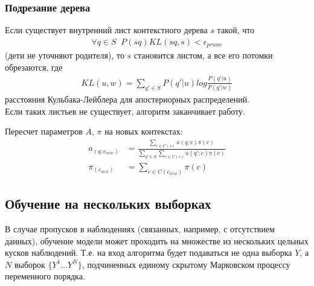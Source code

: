 \documentclass{matmex-diploma-custom}
\begin{document}
\subsubsection{Подрезание дерева} 
Если существует внутренний лист контекстного дерева $ s $ такой, что 
\begin{align}
\forall q \in S \;\; P(sq)\textit{KL}(sq, s) < \epsilon_{\textit{prune}} 
\end{align}
(дети не уточняют родителя), то $ s $ становится листом, а все его потомки обрезаются, где
\begin{align}
\textit{KL}(u, w) = \sum_{q' \in S} P(q'|u) \textit{log}\frac{P(q'|u)}{P(q'|w)}
\end{align}
расстояния Кульбака-Лейблера для апостериорных распределений.
\\Если таких листьев не существует, алгоритм заканчивает работу.

Пересчет параметров $ A $, $\pi$ на новых контекстах:
\begin{align}
a_(q; c_{\textit{new}}) &= \frac{\sum_{c \in C(s)} {a(q; c)\pi(c)}}{\sum_{q' \in S}\sum_{c \in C(s)} {a(q';c)\pi(c)}} 
\\
\pi_(c_{\textit{new}}) &= \sum_{c \in C(c_{\textit{new}})}{\pi(c)}
\end{align}


\subsection{Обучение на нескольких выборках}
В случае пропусков в наблюдениях (связанных, например, с отсутствием данных), обучение модели может проходить на множестве из нескольких цельных кусков наблюдений.
Т.е. на вход алгоритма будет подаваться не одна выборка $Y$, а                                                                                                                                                                                                                                                                                                                                                                                                                                                                                                                                                                                                                                                              $ N $ выборок $ \{Y^{1} \ldots Y^{N}\}$, подчиненных единому скрытому Марковском процессу переменного порядка.
\end{document}
